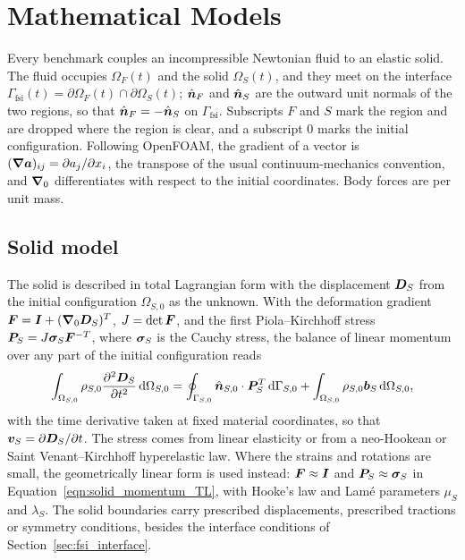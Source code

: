 \section{Mathematical Models}\label{sec:math_model}

Every benchmark couples an incompressible Newtonian fluid to an elastic solid.
The fluid occupies $\Omega_F(t)$ and the solid $\Omega_S(t)$, and they meet on the interface $\Gamma_\text{fsi}(t) = \partial\Omega_F(t) \cap \partial\Omega_S(t)$; $\hat{\boldsymbol{n}}_F$ and $\hat{\boldsymbol{n}}_S$ are the outward unit normals of the two regions, so that $\hat{\boldsymbol{n}}_F = -\hat{\boldsymbol{n}}_S$ on $\Gamma_\text{fsi}$.
Subscripts $F$ and $S$ mark the region and are dropped where the region is clear, and a subscript $0$ marks the initial configuration.
Following OpenFOAM, the gradient of a vector is $(\boldsymbol{\nabla}\boldsymbol{a})_{ij} = \partial a_j/\partial x_i$, the transpose of the usual continuum-mechanics convention, and $\boldsymbol{\nabla}_0$ differentiates with respect to the initial coordinates.
Body forces are per unit mass.

\subsection{Solid model} \label{sec:solid_model}

The solid is described in total Lagrangian form with the displacement $\boldsymbol{D}_S$ from the initial configuration $\Omega_{S,0}$ as the unknown.
With the deformation gradient $\boldsymbol{F} = \boldsymbol{I} + (\boldsymbol{\nabla}_0 \boldsymbol{D}_S)^T$, $J = \det\boldsymbol{F}$, and the first Piola--Kirchhoff stress $\boldsymbol{P}_S = J\boldsymbol{\sigma}_S\boldsymbol{F}^{-T}$, where $\boldsymbol{\sigma}_S$ is the Cauchy stress, the balance of linear momentum over any part of the initial configuration reads
\begin{equation}
    \int_{\Omega_{S,0}} \rho_{S,0} \frac{\partial^2 \boldsymbol{D}_S}{\partial t^2} \, \text{d}\Omega_{S,0}
    =
    \oint_{\Gamma_{S,0}} \hat{\boldsymbol{n}}_{S,0} \cdot \boldsymbol{P}_S^T \, \text{d}\Gamma_{S,0}
    +
    \int_{\Omega_{S,0}} \rho_{S,0} \boldsymbol{b}_S \, \text{d}\Omega_{S,0},
    \label{eqn:solid_momentum_TL}
\end{equation}
with the time derivative taken at fixed material coordinates, so that $\boldsymbol{v}_S = \partial\boldsymbol{D}_S/\partial t$.
The stress comes from linear elasticity or from a neo-Hookean or Saint Venant--Kirchhoff hyperelastic law.
Where the strains and rotations are small, the geometrically linear form is used instead: $\boldsymbol{F} \approx \boldsymbol{I}$ and $\boldsymbol{P}_S \approx \boldsymbol{\sigma}_S$ in Equation~\eqref{eqn:solid_momentum_TL}, with Hooke's law and Lam\'e parameters $\mu_S$ and $\lambda_S$.
The solid boundaries carry prescribed displacements, prescribed tractions or symmetry conditions, besides the interface conditions of Section~\ref{sec:fsi_interface}.

